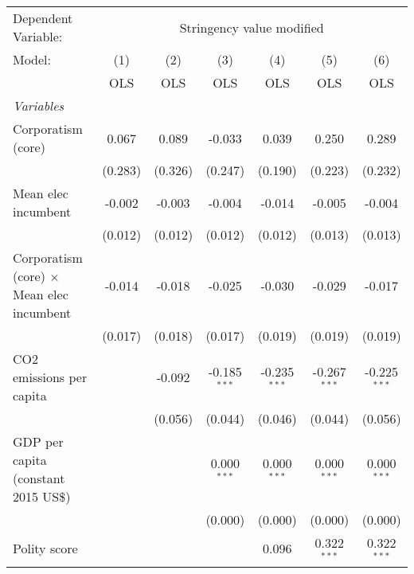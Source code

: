 
\begingroup
\centering
\begin{tabular}{lcccccc}
   \toprule
   Dependent Variable: & \multicolumn{6}{c}{Stringency value modified}\\
   Model:                                           & (1)     & (2)     & (3)            & (4)            & (5)            & (6)\\  
                                                    &  OLS    & OLS     & OLS            & OLS            & OLS            & OLS\\  
   \midrule
   \emph{Variables}\\
   Corporatism (core)                               & 0.067   & 0.089   & -0.033         & 0.039          & 0.250          & 0.289\\   
                                                    & (0.283) & (0.326) & (0.247)        & (0.190)        & (0.223)        & (0.232)\\   
   Mean elec incumbent                              & -0.002  & -0.003  & -0.004         & -0.014         & -0.005         & -0.004\\   
                                                    & (0.012) & (0.012) & (0.012)        & (0.012)        & (0.013)        & (0.013)\\   
   Corporatism (core) $\times$ Mean elec incumbent  & -0.014  & -0.018  & -0.025         & -0.030         & -0.029         & -0.017\\   
                                                    & (0.017) & (0.018) & (0.017)        & (0.019)        & (0.019)        & (0.019)\\   
   CO2 emissions per capita                         &         & -0.092  & -0.185$^{***}$ & -0.235$^{***}$ & -0.267$^{***}$ & -0.225$^{***}$\\   
                                                    &         & (0.056) & (0.044)        & (0.046)        & (0.044)        & (0.056)\\   
   GDP per capita (constant 2015 US\$)              &         &         & 0.000$^{***}$  & 0.000$^{***}$  & 0.000$^{***}$  & 0.000$^{***}$\\   
                                                    &         &         & (0.000)        & (0.000)        & (0.000)        & (0.000)\\   
   Polity score                                     &         &         &                & 0.096          & 0.322$^{***}$  & 0.322$^{***}$\\   

\end{tabular}
